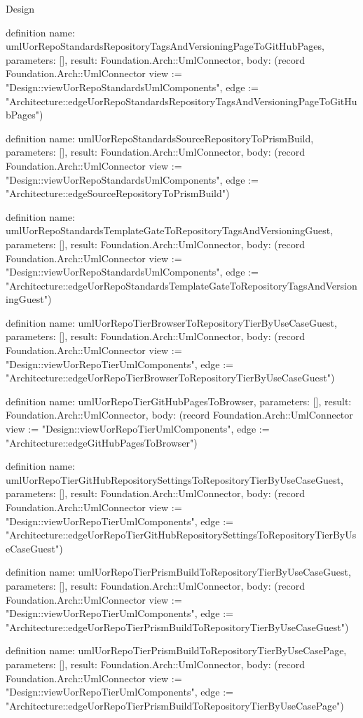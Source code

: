 \begin{lexlean}{Design}
\begin{semanticmodule}
definition{
  name: umlUorRepoStandardsRepositoryTagsAndVersioningPageToGitHubPages,
  parameters: [],
  result: Foundation.Arch::UmlConnector,
  body: (record Foundation.Arch::UmlConnector {view := "Design::viewUorRepoStandardsUmlComponents", edge := "Architecture::edgeUorRepoStandardsRepositoryTagsAndVersioningPageToGitHubPages"})
}

definition{
  name: umlUorRepoStandardsSourceRepositoryToPrismBuild,
  parameters: [],
  result: Foundation.Arch::UmlConnector,
  body: (record Foundation.Arch::UmlConnector {view := "Design::viewUorRepoStandardsUmlComponents", edge := "Architecture::edgeSourceRepositoryToPrismBuild"})
}

definition{
  name: umlUorRepoStandardsTemplateGateToRepositoryTagsAndVersioningGuest,
  parameters: [],
  result: Foundation.Arch::UmlConnector,
  body: (record Foundation.Arch::UmlConnector {view := "Design::viewUorRepoStandardsUmlComponents", edge := "Architecture::edgeUorRepoStandardsTemplateGateToRepositoryTagsAndVersioningGuest"})
}

definition{
  name: umlUorRepoTierBrowserToRepositoryTierByUseCaseGuest,
  parameters: [],
  result: Foundation.Arch::UmlConnector,
  body: (record Foundation.Arch::UmlConnector {view := "Design::viewUorRepoTierUmlComponents", edge := "Architecture::edgeUorRepoTierBrowserToRepositoryTierByUseCaseGuest"})
}

definition{
  name: umlUorRepoTierGitHubPagesToBrowser,
  parameters: [],
  result: Foundation.Arch::UmlConnector,
  body: (record Foundation.Arch::UmlConnector {view := "Design::viewUorRepoTierUmlComponents", edge := "Architecture::edgeGitHubPagesToBrowser"})
}

definition{
  name: umlUorRepoTierGitHubRepositorySettingsToRepositoryTierByUseCaseGuest,
  parameters: [],
  result: Foundation.Arch::UmlConnector,
  body: (record Foundation.Arch::UmlConnector {view := "Design::viewUorRepoTierUmlComponents", edge := "Architecture::edgeUorRepoTierGitHubRepositorySettingsToRepositoryTierByUseCaseGuest"})
}

definition{
  name: umlUorRepoTierPrismBuildToRepositoryTierByUseCaseGuest,
  parameters: [],
  result: Foundation.Arch::UmlConnector,
  body: (record Foundation.Arch::UmlConnector {view := "Design::viewUorRepoTierUmlComponents", edge := "Architecture::edgeUorRepoTierPrismBuildToRepositoryTierByUseCaseGuest"})
}

definition{
  name: umlUorRepoTierPrismBuildToRepositoryTierByUseCasePage,
  parameters: [],
  result: Foundation.Arch::UmlConnector,
  body: (record Foundation.Arch::UmlConnector {view := "Design::viewUorRepoTierUmlComponents", edge := "Architecture::edgeUorRepoTierPrismBuildToRepositoryTierByUseCasePage"})
}


\end{semanticmodule}
\end{lexlean}
